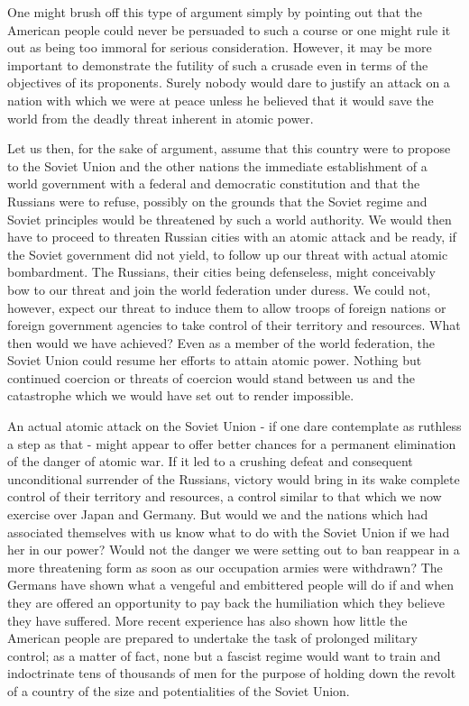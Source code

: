 One might brush off this type of argument simply by pointing out that the American people could never be persuaded to such a course or one might rule it out as being too immoral for serious consideration. However, it may be more important to demonstrate the futility of such a crusade even in terms of the objectives of its proponents. Surely nobody would dare to justify an attack on a nation with which we were at peace unless he believed that it would save the world from the deadly threat inherent in atomic power.

Let us then, for the sake of argument, assume that this country were to propose to the Soviet Union and the other nations the immediate establishment of a world government with a federal and democratic constitution and that the Russians were to refuse, possibly on the grounds that the Soviet regime and Soviet principles would be threatened by such a world authority. We would then have to proceed to threaten Russian cities with an atomic attack and be ready, if the Soviet government did not yield, to follow up our threat with actual atomic bombardment. The Russians, their cities being defenseless, might conceivably bow to our threat and join the world federation under duress. We could not, however, expect our threat to induce them to allow troops of foreign nations or foreign government agencies to take control of their territory and resources. What then would we have achieved? Even as a member of the world federation, the Soviet Union could resume her efforts to attain atomic power. Nothing but continued coercion or threats of coercion would stand between us and the catastrophe which we would have set out to render impossible.

An actual atomic attack on the Soviet Union - if one dare contemplate as ruthless a step as that - might appear to offer better chances for a permanent elimination of the danger of atomic war. If it led to a crushing defeat and consequent unconditional surrender of the Russians, victory would bring in its wake complete control of their territory and resources, a control similar to that which we now exercise over Japan and Germany. But would we and the nations which had associated themselves with us know what to do with the Soviet Union if we had her in our power? Would not the danger we were setting out to ban reappear in a more threatening form as soon as our occupation armies were withdrawn? The Germans have shown what a vengeful and embittered people will do if and when they are offered an opportunity to pay back the humiliation which they believe they have suffered. More recent experience has also shown how little the American people are prepared to undertake the task of prolonged military control; as a matter of fact, none but a fascist regime would want to train and indoctrinate tens of thousands of men for the purpose of holding down the revolt of a country of the size and potentialities of the Soviet Union.

